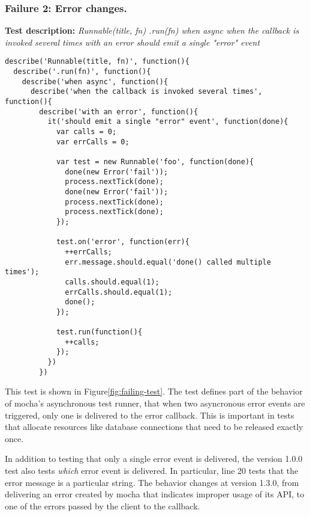 \subsubsection{Failure 2: Error changes.}
\label{sec:failure2}
{\bf Test description: }
%
{\em Runnable(title, fn) .run(fn) when async when the callback is
  invoked several times with an error should emit a single "error"
  event }

\begin{figure*}
\begin{lstlisting}
describe('Runnable(title, fn)', function(){
  describe('.run(fn)', function(){
    describe('when async', function(){
      describe('when the callback is invoked several times', function(){
        describe('with an error', function(){
          it('should emit a single "error" event', function(done){
            var calls = 0;
            var errCalls = 0;

            var test = new Runnable('foo', function(done){
              done(new Error('fail'));
              process.nextTick(done);
              done(new Error('fail'));
              process.nextTick(done);
              process.nextTick(done);
            });

            test.on('error', function(err){
              ++errCalls;
              err.message.should.equal('done() called multiple times');
              calls.should.equal(1);
              errCalls.should.equal(1);
              done();
            });

            test.run(function(){
              ++calls;
            });
          })
        })
\end{lstlisting}
\caption{A failing mocha jsapi test}
\label{fig:failing-test}
\end{figure*}

This test is shown in Figure\~\ref{fig:failing-test}. The test defines
part of the behavior of mocha's asynchronous test runner, that when
two asyncronous error events are triggered, only one is delivered to
the error callback. This is important in tests that allocate resources
like database connections that need to be released exactly once.

In addition to testing that only a single error event is delivered,
the version 1.0.0 test also tests {\em which} error event is
delivered. In particular, line 20 tests that the error message is a
particular string. The behavior changes at version 1.3.0, from
delivering an error created by mocha that indicates improper usage of
its API, to one of the errors passed by the client to the callback.

